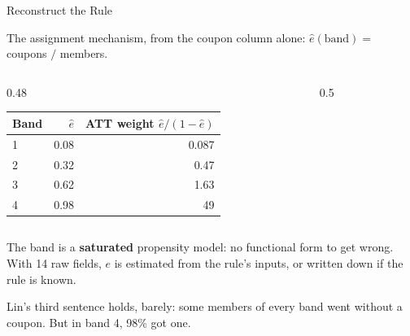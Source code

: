 \documentclass[aspectratio=169, 11pt, handout]{beamer}
\begin{document}
\begin{frame}{Reconstruct the Rule}

The assignment mechanism, from the coupon column alone: $\hat e(\text{band}) = $ coupons $/$ members.

\begin{columns}[T]
\begin{column}{0.48\textwidth}
\begin{center}
\small
\begin{tabular}{lrr}
\toprule
\textbf{Band} & $\hat e$ & \textbf{ATT weight $\hat e/(1-\hat e)$} \\
\midrule
1 & 0.08 & 0.087 \\
2 & 0.32 & 0.47 \\
3 & 0.62 & 1.63 \\
4 & 0.98 & 49 \\
\bottomrule
\end{tabular}
\end{center}
\end{column}
\begin{column}{0.5\textwidth}
\begin{center}
\end{center}
\end{column}
\end{columns}

The band is a \textbf{saturated} propensity model: no functional form to get wrong. With 14 raw fields, $e$ is estimated from the rule's inputs, or written down if the rule is known.

Lin's third sentence holds, barely: some members of every band went without a coupon. But in band 4, 98\% got one.
\end{frame}
\end{document}
